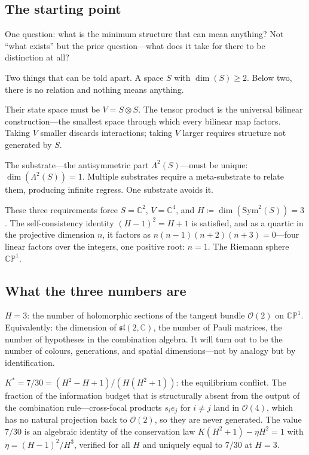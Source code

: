\documentclass[11pt,a4paper]{article}
\theoremstyle{definition}
\theoremstyle{remark}
\newcommand{\CP}{\mathbb{CP}}
\newcommand{\C}{\mathbb{C}}
\newcommand{\Sym}{\mathrm{Sym}}
\begin{document}
\subsection*{The starting point}

One question: what is the minimum structure that can mean anything? Not ``what exists'' but the prior question---what does it take for there to be distinction at all?

Two things that can be told apart. A space $S$ with $\dim(S)\geq 2$. Below two, there is no relation and nothing means anything.

Their state space must be $V=S\otimes S$. The tensor product is the universal bilinear construction---the smallest space through which every bilinear map factors. Taking $V$ smaller discards interactions; taking $V$ larger requires structure not generated by $S$.

The substrate---the antisymmetric part $\Lambda^2(S)$---must be unique: $\dim(\Lambda^2(S))=1$. Multiple substrates require a meta-substrate to relate them, producing infinite regress. One substrate avoids it.

These three requirements force $S=\C^2$, $V=\C^4$, and $H\coloneqq\dim(\Sym^2(S))=3$. The self-consistency identity $(H-1)^2=H+1$ is satisfied, and as a quartic in the projective dimension $n$, it factors as $n(n-1)(n+2)(n+3)=0$---four linear factors over the integers, one positive root: $n=1$. The Riemann sphere $\CP^1$.

\subsection*{What the three numbers are}

$H=3$: the number of holomorphic sections of the tangent bundle $\mathcal{O}(2)$ on $\CP^1$. Equivalently: the dimension of $\mathfrak{sl}(2,\C)$, the number of Pauli matrices, the number of hypotheses in the combination algebra. It will turn out to be the number of colours, generations, and spatial dimensions---not by analogy but by identification.

$K^*=7/30=(H^2-H+1)/(H(H^2+1))$: the equilibrium conflict. The fraction of the information budget that is structurally absent from the output of the combination rule---cross-focal products $s_ie_j$ for $i\neq j$ land in $\mathcal{O}(4)$, which has no natural projection back to $\mathcal{O}(2)$, so they are never generated. The value $7/30$ is an algebraic identity of the conservation law $K(H^2+1)-\eta H^2=1$ with $\eta=(H-1)^2/H^3$, verified for all $H$ and uniquely equal to $7/30$ at $H=3$.
\end{document}

